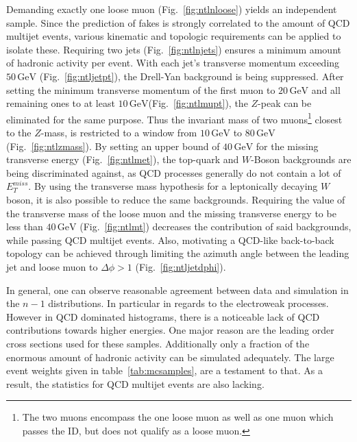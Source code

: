 Demanding exactly one loose muon (Fig.~\ref{fig:ntlnloose}) yields an independent sample. Since the prediction of fakes is strongly correlated to the amount of QCD multijet events, various kinematic and topologic requirements can be applied to isolate these. Requiring two jets (Fig.~\ref{fig:ntlnjets}) ensures a minimum amount of hadronic activity per event. With each jet's transverse momentum exceeding $50\,\text{GeV}$ (Fig.~\ref{fig:ntljetpt}), the Drell-Yan background is being suppressed. After setting the minimum transverse momentum of the first muon to $20\,\text{GeV}$ and all remaining ones to at least $10\,\text{GeV}$(Fig.~\ref{fig:ntlmupt}), the $Z$-peak can be eliminated for the same purpose. Thus the invariant mass of two muons\footnote{The two muons encompass the one loose muon as well as one muon which passes the ID, but does not qualify as a loose muon.} closest to the $Z$-mass, is restricted to a window from $10\,\text{GeV}$ to $80\,\text{GeV}$ (Fig.~\ref{fig:ntlzmass}). By setting an upper bound of $40\,\text{GeV}$ for the missing transverse energy (Fig.~\ref{fig:ntlmet}), the top-quark and $W$-Boson backgrounds are being discriminated against, as QCD processes generally do not contain a lot of $E_{T}^{miss}$. By using the transverse mass hypothesis for a leptonically decaying $W$ boson, it is also possible to reduce the same backgrounds. Requiring the value of the transverse mass of the loose muon and the missing transverse energy to be less than $40\,\text{GeV}$ (Fig.~\ref{fig:ntlmt}) decreases the contribution of said backgrounds, while passing QCD multijet events. Also, motivating a QCD-like back-to-back topology can be achieved through limiting the azimuth angle between the leading jet and loose muon to $\Delta \phi > 1$ (Fig.~\ref{fig:ntljetdphi}).

In general, one can observe reasonable agreement between data and simulation in the $n - 1$ distributions. In particular in regards to the electroweak processes. However in QCD dominated histograms, there is a noticeable lack of QCD contributions towards higher energies. One major reason are the leading order cross sections used for these samples. Additionally only a fraction of the enormous amount of hadronic activity can be simulated adequately. The large event weights given in table~\ref{tab:mcsamples}, are a testament to that. As a result, the statistics for QCD multijet events are also lacking.

